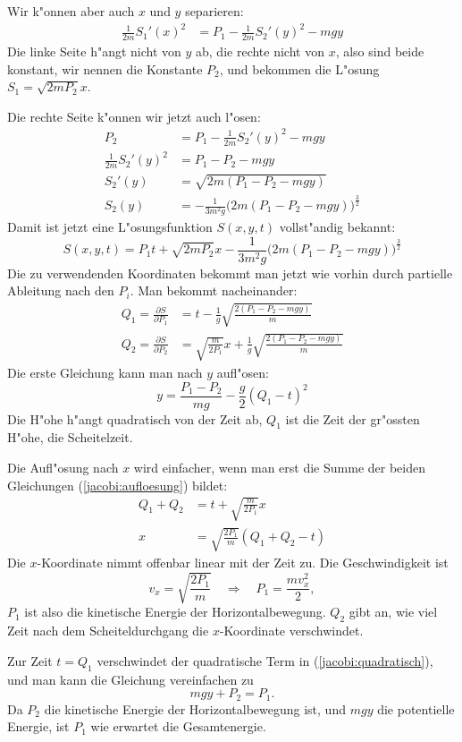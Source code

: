 Wir k"onnen aber auch $x$ und $y$ separieren:
\begin{align*}
\frac1{2m}S_1'(x)^2&=P_1-\frac1{2m}S_2'(y)^2-mgy
\end{align*}
Die linke Seite h"angt nicht von $y$ ab, die rechte nicht von $x$, also sind
beide konstant, wir nennen die Konstante $P_2$, und bekommen
die L"osung $S_1=\sqrt{2mP_2} x$.

Die rechte Seite k"onnen wir jetzt auch l"osen:
\begin{align*}
P_2&=
P_1-\frac1{2m}S_2'(y)^2-mgy
\\
\frac1{2m}S_2'(y)^2
&=
P_1-P_2-mgy
\\
S_2'(y)&=\sqrt{
2m(P_1-P_2-mgy)
}
\\
S_2(y)
&=
-\frac1{3m^2g}\bigl(2m(P_1-P_2-mgy)\bigr)^{\frac32}
\end{align*}
Damit ist jetzt eine L"osungsfunktion $S(x,y,t)$ vollst"andig
bekannt:
\[
S(x,y,t)=P_1t+\sqrt{2mP_2}x
-
\frac1{3m^2g}\bigl(2m(P_1-P_2-mgy)\bigr)^{\frac32}
\]
Die zu verwendenden Koordinaten bekommt man jetzt wie vorhin durch
partielle Ableitung nach den $P_i$. Man bekommt nacheinander:
\begin{equation}
\begin{aligned}
Q_1=\frac{\partial S}{\partial P_1}
&=
t-
\frac1{g}\sqrt{\frac{2(P_1-P_2-mgy)}{m}}
\\
Q_2=\frac{\partial S}{\partial P_2}
&=
\sqrt{\frac{m}{2P_1}}x
+
\frac1{g}\sqrt{\frac{2(P_1-P_2-mgy)}{m}}
\end{aligned}
\label{jacobi:aufloesung}
\end{equation}
Die erste Gleichung kann man nach $y$ aufl"osen:
\begin{equation}
y=
\frac{P_1-P_2}{mg}-\frac{g}{2}(Q_1-t)^2
\label{jacobi:quadratisch}
\end{equation}
Die H"ohe h"angt quadratisch von der Zeit ab, $Q_1$ ist die Zeit
der gr"ossten H"ohe, die Scheitelzeit.

Die Aufl"osung nach $x$ wird einfacher, wenn man erst die Summe der beiden
Gleichungen (\ref{jacobi:aufloesung}) bildet:
\begin{align*}
Q_1+Q_2&=t+\sqrt{\frac{m}{2P_1}}x\\
x&=\sqrt{\frac{2P_1}{m}}(Q_1+Q_2-t)
\end{align*}
Die $x$-Koordinate nimmt offenbar linear mit der Zeit zu. Die
Geschwindigkeit ist
\[
v_x=\sqrt{\frac{2P_1}{m}}\quad\Rightarrow\quad P_1=\frac{mv_x^2}2,
\]
$P_1$ ist also die kinetische Energie der Horizontalbewegung.
$Q_2$ gibt an, wie viel Zeit nach dem Scheiteldurchgang die $x$-Koordinate
verschwindet.

Zur Zeit $t=Q_1$ verschwindet der quadratische Term in
(\ref{jacobi:quadratisch}), und man kann die Gleichung vereinfachen
zu 
\[
mgy + P_2=P_1.
\]
Da $P_2$ die kinetische Energie der Horizontalbewegung ist, und $mgy$
die potentielle Energie, ist $P_1$ wie erwartet die Gesamtenergie.

